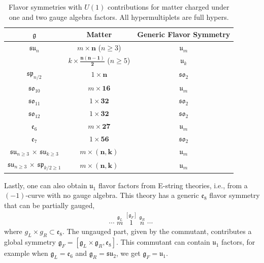 \documentclass[11pt]{article}
\numberwithin{equation}{section}
\newcommand{\fu}{\mathfrak{u}}
\newcommand{\fsu}{\mathfrak{su}}
\newcommand{\fg}{\mathfrak{g}}
\newcommand{\fe}{\mathfrak{e}}
\begin{document}
\begin{table}[t]
    \centering
    \begin{tabular}{|c|c|c|} \hline
        $\fg$ &  Matter & Generic Flavor Symmetry\\ \hline
        $\mathfrak{su}_{n}$  & $m \times \boldsymbol{n}$ ($n\geq 3$) & $\mathfrak{u}_{m}$ \\ 
        & $k \times \boldsymbol{\frac{n(n-1)}{2}}$ ($n\geq 5$) & $\mathfrak{u}_{k}$ \\ \hline
      $\mathfrak{sp}_{n/2}$ & $1 \times \boldsymbol{n}$ & $\mathfrak{so}_{2}$ \\ \hline
      $\mathfrak{so}_{10}$ & $m \times \boldsymbol{16}$ & $\mathfrak{u}_{m}$ \\ \hline
       $\mathfrak{so}_{11}$ & $1 \times \boldsymbol{32}$ & $\mathfrak{so}_{2}$ \\ \hline
        $\mathfrak{so}_{12}$ & $1 \times \boldsymbol{32}$ & $\mathfrak{so}_{2}$ \\ \hline
      $\mathfrak{e}_{6}$ & $m \times \boldsymbol{27}$ & $\mathfrak{u}_{m}$ \\ \hline
      $\mathfrak{e}_{7}$ & $1 \times \boldsymbol{56}$ & $\mathfrak{so}_{2}$ \\ \hline \hline
        $\mathfrak{su}_{n \geq 3}$ $\times$ $\mathfrak{su}_{k \geq 3}$  & $m \times \boldsymbol{(n,k)}$ & $\mathfrak{u}_{m}$  \\ \hline
        $\mathfrak{su}_{n \geq 3}$ $\times$ $\mathfrak{sp}_{k/2 \geq 1}$ & $m \times \boldsymbol{(n,k)}$ & $\mathfrak{u}_{m}$  \\ \hline
      \hline
    \end{tabular}
    \caption{Flavor symmetries with $U(1)$ contributions for matter charged under one and two gauge algebra factors. All hypermultiplets are full hypers.}
    \label{tab:flavs1}
\end{table}

Lastly, one can also obtain $\fu_1$ flavor factors from E-string theories, i.e., from a $(-1)$-curve with no gauge algebra. This theory has a generic $\mathfrak{e}_8$ flavor symmetry that can be partially gauged,
\begin{align}
\cdots \, \,
{\overset{\mathfrak{g}_L}{m}} \, \,
{\overset{{\left[\mathfrak{g}_{F}\right]}}{1}} \, \, 
{\overset{\mathfrak{g}_R}{n}} \, \,
\cdots \, \,
\end{align}
where $g_{L} \times g_{R} \subset \mathfrak{e}_{8}$. The ungauged part, given by the commutant, contributes a global symmetry $\mathfrak{g}_{F}=[\mathfrak{g}_{L}\times \mathfrak{g}_{R}, \mathfrak{e}_{8}]$. This commutant can contain $\fu_1$ factors, for example when $\fg_L=\fe_6$ and $\fg_R=\fsu_2$, we get $\fg_F=\mathfrak{u}_1$.
\end{document}
